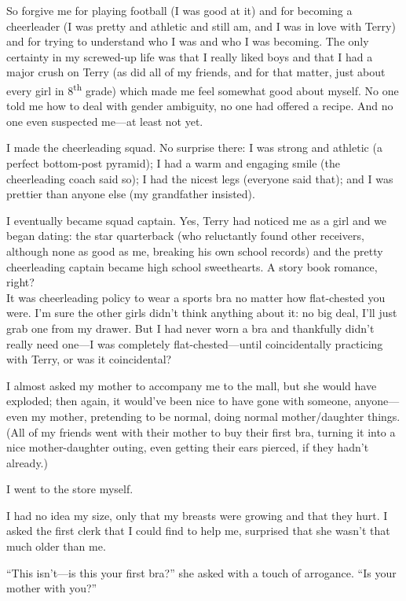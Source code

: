 So forgive me for playing football (I was good at it) and for becoming a
cheerleader (I was pretty and athletic and still am, and I was in love
with Terry) and for trying to understand who I was and who I was
becoming. The only certainty in my screwed-up life was that I really
liked boys and that I had a major crush on Terry (as did all of my
friends, and for that matter, just about every girl in
8\textsuperscript{th} grade) which made me feel somewhat good about
myself. No one told me how to deal with gender ambiguity, no one had
offered a recipe. And no one even suspected me---at least not yet.

I made the cheerleading squad. No surprise there: I was strong and
athletic (a perfect bottom-post pyramid); I had a warm and engaging
smile (the cheerleading coach said so); I had the nicest legs (everyone
said that); and I was prettier than anyone else (my grandfather
insisted).

I eventually became squad captain. Yes, Terry had noticed me as a girl
and we began dating: the star quarterback (who reluctantly found other
receivers, although none as good as me, breaking his own school records)
and the pretty cheerleading captain became high school sweethearts. A
story book romance, right?\\

It was cheerleading policy to wear a sports bra no matter how
flat-chested you were. I'm sure the other girls didn't think anything
about it: no big deal, I'll just grab one from my drawer. But I had
never worn a bra and thankfully didn't really need one---I was
completely flat-chested---until coincidentally practicing with Terry, or
was it coincidental?

I almost asked my mother to accompany me to the mall, but she would have
exploded; then again, it would've been nice to have gone with someone,
anyone---even my mother, pretending to be normal, doing normal
mother/daughter things. (All of my friends went with their mother to buy
their first bra, turning it into a nice mother-daughter outing, even
getting their ears pierced, if they hadn't already.)

I went to the store myself.

I had no idea my size, only that my breasts were growing and that they
hurt. I asked the first clerk that I could find to help me, surprised
that she wasn't that much older than me.

``This isn't---is this your first bra?'' she asked with a touch of
arrogance. ``Is your mother with you?''

